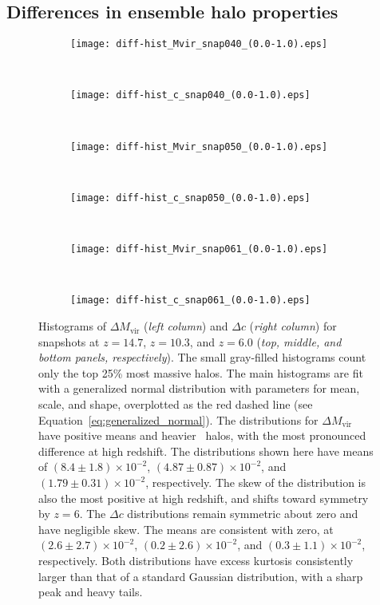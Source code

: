 \subsection{Differences in ensemble halo properties}


\begin{figure*}[t]
	\centering
	\begin{subfigure}{}
		\texttt{[image: diff-hist\_Mvir\_snap040\_(0.0-1.0).eps]}
	\end{subfigure}
	~
	\begin{subfigure}{}
		\texttt{[image: diff-hist\_c\_snap040\_(0.0-1.0).eps]}
	\end{subfigure}
	\\
	\begin{subfigure}{}
		\texttt{[image: diff-hist\_Mvir\_snap050\_(0.0-1.0).eps]}
	\end{subfigure}
	~
	\begin{subfigure}{}
		\texttt{[image: diff-hist\_c\_snap050\_(0.0-1.0).eps]}
	\end{subfigure}
	\\
	\begin{subfigure}{}
		\texttt{[image: diff-hist\_Mvir\_snap061\_(0.0-1.0).eps]}
	\end{subfigure}
	~
	\begin{subfigure}{}
		\texttt{[image: diff-hist\_c\_snap061\_(0.0-1.0).eps]}
	\end{subfigure}
	\caption[Histograms of $\Delta M_{\mathrm{vir}}$ and $\Delta c$]{\footnotesize Histograms of $\Delta M_{\mathrm{vir}}$ (\textit{left column}) and $\Delta c$ (\textit{right column}) for snapshots at $z = 14.7$, $z = 10.3$, and $z = 6.0$ (\textit{top, middle, and bottom panels, respectively}).  The small gray-filled histograms count only the top 25\% most massive halos.  The main histograms are fit with a generalized normal distribution with parameters for mean, scale, and shape, overplotted as the red dashed line (see Equation~\ref{eq:generalized_normal}).  The distributions for $\Delta M_{\mathrm{vir}}$ have positive means and heavier \lpt\ halos, with the most pronounced difference at high redshift.  The distributions shown here have means of $(8.4 \pm 1.8) \times 10^{-2}$, $(4.87 \pm 0.87) \times 10^{-2}$, and $(1.79 \pm 0.31) \times 10^{-2}$, respectively.  The skew of the distribution is also the most positive at high redshift, and shifts toward symmetry by $z = 6$.  The $\Delta c$ distributions remain symmetric about zero and have negligible skew.  The means are consistent with zero, at $(2.6 \pm 2.7) \times 10^{-2}$, $(0.2 \pm 2.6) \times 10^{-2}$, and $(0.3 \pm 1.1) \times 10^{-2}$, respectively.  Both distributions have excess kurtosis consistently larger than that of a standard Gaussian distribution, with a sharp peak and heavy tails.}
	\label{fig:diff-hist}
\end{figure*}

